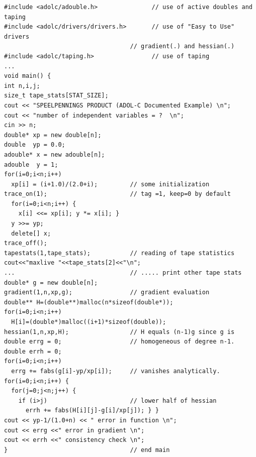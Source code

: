 \documentclass[11pt,twoside]{article}
\begin{document}
\begin{verbatim}
#include <adolc/adouble.h>               // use of active doubles and taping
#include <adolc/drivers/drivers.h>       // use of "Easy to Use" drivers 
                                   // gradient(.) and hessian(.)
#include <adolc/taping.h>                // use of taping
...
void main() {
int n,i,j;
size_t tape_stats[STAT_SIZE];
cout << "SPEELPENNINGS PRODUCT (ADOL-C Documented Example) \n";
cout << "number of independent variables = ?  \n";
cin >> n;
double* xp = new double[n];          
double  yp = 0.0;
adouble* x = new adouble[n];      
adouble  y = 1;
for(i=0;i<n;i++)
  xp[i] = (i+1.0)/(2.0+i);         // some initialization
trace_on(1);                       // tag =1, keep=0 by default
  for(i=0;i<n;i++) {
    x[i] <<= xp[i]; y *= x[i]; }      
  y >>= yp;
  delete[] x;                      
trace_off();
tapestats(1,tape_stats);           // reading of tape statistics
cout<<"maxlive "<<tape_stats[2]<<"\n";
...                                // ..... print other tape stats
double* g = new double[n];        
gradient(1,n,xp,g);                // gradient evaluation
double** H=(double**)malloc(n*sizeof(double*));
for(i=0;i<n;i++)
  H[i]=(double*)malloc((i+1)*sizeof(double)); 
hessian(1,n,xp,H);                 // H equals (n-1)g since g is
double errg = 0;                   // homogeneous of degree n-1.
double errh = 0;
for(i=0;i<n;i++)
  errg += fabs(g[i]-yp/xp[i]);     // vanishes analytically.
for(i=0;i<n;i++) {
  for(j=0;j<n;j++) {
    if (i>j)                       // lower half of hessian
      errh += fabs(H[i][j]-g[i]/xp[j]); } }
cout << yp-1/(1.0+n) << " error in function \n";
cout << errg <<" error in gradient \n";
cout << errh <<" consistency check \n";
}                                  // end main
\end{verbatim}
%
\end{document}
